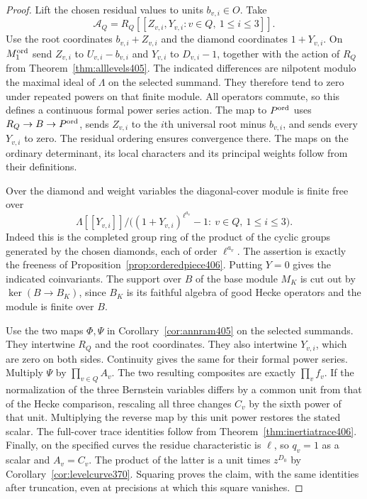 \documentclass[a4paper,11pt]{article}
\theoremstyle{definition}
\theoremstyle{remark}
\numberwithin{equation}{section}
\begin{document}
\begin{proof}
Lift the chosen residual values to units \(b_{v,i}\in O\).
Take
\[
            \mathcal A_Q=R_Q[[Z_{v,i},Y_{v,i}:
                                        v\in Q,\ 1\le i\le3]] .
\]
Use the root coordinates \(b_{v,i}+Z_{v,i}\) and the
diamond coordinates \(1+Y_{v,i}\). On \(M_1^{\rm ord}\)
send \(Z_{v,i}\) to \(U_{v,i}-b_{v,i}\) and \(Y_{v,i}\)
to \(D_{v,i}-1\), together with the action of \(R_Q\)
from Theorem~\ref{thm:alllevels405}. The indicated
differences are nilpotent modulo the maximal ideal of
\(\Lambda\) on the selected summand. They therefore tend
to zero under repeated powers on that finite module. All
operators commute, so this defines a continuous formal
power series action. The map to \(P^{\rm ord}\) uses
\(R_Q\to B\to P^{\rm ord}\), sends \(Z_{v,i}\) to the
\(i\)th universal root minus \(b_{v,i}\), and sends every
\(Y_{v,i}\) to zero. The residual ordering ensures
convergence there. The maps on the ordinary determinant,
its local characters and its principal weights follow
from their definitions.

Over the diamond and weight variables the diagonal-cover
module is finite free over
\[
 \Lambda[[Y_{v,i}]]\big/
       \bigl((1+Y_{v,i})^{\ell^{a_v}}-1:\ v\in Q,\ 1\le i\le3\bigr).
\]
Indeed this is the completed group ring of the product of
the cyclic groups generated by the chosen diamonds, each
of order \(\ell^{a_v}\). The assertion is exactly the
freeness of Proposition~\ref{prop:orderedpiece406}.
Putting \(Y=0\) gives the indicated coinvariants. The
support over \(B\) of the base module \(M_K\) is cut out by
\(\ker(B\to B_K)\), since \(B_K\) is its faithful algebra
of good Hecke operators and the module is finite over \(B\).

Use the two maps \(\Phi,\Psi\) in
Corollary~\ref{cor:annram405} on the selected summands.
They intertwine \(R_Q\) and the root coordinates. They
also intertwine \(Y_{v,i}\), which are zero on both sides.
Continuity gives the same for their formal power series.
Multiply \(\Psi\) by \(\prod_{v\in Q} A_v\). The two resulting
composites are exactly \(\prod_v f_v\). If the normalization
of the three Bernstein variables differs by a common unit
from that of the Hecke comparison, rescaling all three
changes \(C_v\) by the sixth power of that unit. Multiplying
the reverse map by this unit power restores the stated
scalar. The full-cover trace identities follow from
Theorem~\ref{thm:inertiatrace406}. Finally, on the specified
curves the residue characteristic is \(\ell\), so \(q_v=1\)
as a scalar and \(A_v=C_v\). The product of the latter is
a unit times \(z^{D_0}\) by
Corollary~\ref{cor:levelcurve370}. Squaring proves the
claim, with the same identities after truncation, even at
precisions at which this square vanishes.
\end{proof}
\end{document}
